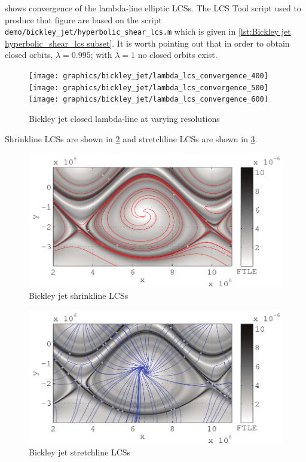 \documentclass{elsarticle}
\begin{document}
 shows convergence of the lambda-line elliptic LCSs. The LCS Tool script used to produce that figure are based on the script \lstinline!demo/bickley_jet/hyperbolic_shear_lcs.m! which is given in \cref{lst:Bickley jet hyperbolic_shear_lcs subset}. It is worth pointing out that in order to obtain closed orbits, $\lambda = 0.995$; with $\lambda = 1$ no closed orbits exist.



\begin{figure}[hbt]
\centering
\texttt{[image: graphics/bickley\_jet/lambda\_lcs\_convergence\_400]}
\texttt{[image: graphics/bickley\_jet/lambda\_lcs\_convergence\_500]}
\texttt{[image: graphics/bickley\_jet/lambda\_lcs\_convergence\_600]}
\caption{Bickley jet closed lambda-line at varying resolutions}
\label{fig:Bickley jet lambda lcs convergence}
\end{figure}

Shrinkline LCSs are shown in \cref{fig:Bickley_jet_strain_lcs} and stretchline LCSs are shown in \cref{fig:Bickley_jet_stretch_lcs}.

\begin{figure}
\centering
\includegraphics[width=.85\textwidth]{graphics/bickley_jet/strain_lcs}
\caption{Bickley jet shrinkline LCSs}
\label{fig:Bickley_jet_strain_lcs}
\end{figure}

\begin{figure}
  \centering
  \includegraphics[width=.85\textwidth]{graphics/bickley_jet/stretch_lcs}
  \caption{Bickley jet stretchline LCSs}
  \label{fig:Bickley_jet_stretch_lcs}
\end{figure}
\end{document}
